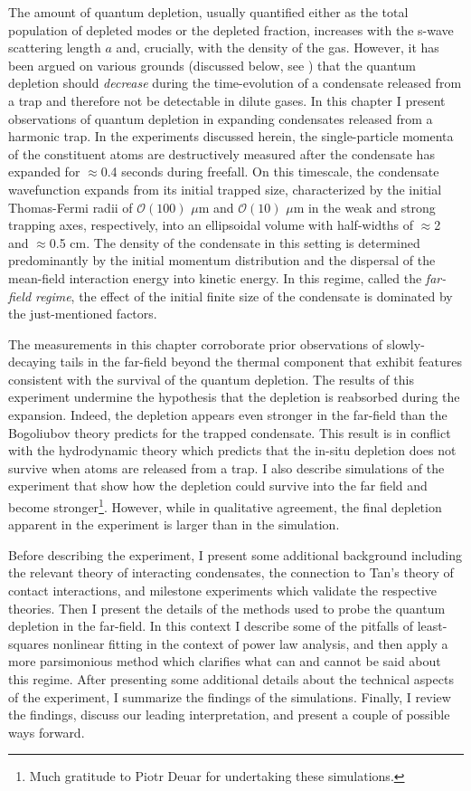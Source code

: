 	The amount of quantum depletion, usually quantified either as the total population of depleted modes or the depleted fraction, increases with the s-wave scattering length $a$ and, crucially, with the density of the gas. 
	However, it has been argued on various grounds (discussed below, see \cite{Xu06,Qu16}) that the quantum depletion should \emph{decrease} during the time-evolution of a condensate released from a trap and therefore not be detectable in dilute gases.
	In this chapter I present observations of quantum depletion in expanding condensates released from a harmonic trap. 
	In the experiments discussed herein, the single-particle momenta of the constituent atoms are destructively measured after the condensate has expanded for $\approx$0.4 seconds during freefall.
	On this timescale, the condensate wavefunction expands from its initial trapped size, characterized by the initial Thomas-Fermi radii of  $\mathcal{O}(100)$ $\mu$m and $\mathcal{O}(10)$ $\mu$m in the weak and strong trapping axes, respectively, into an ellipsoidal volume with half-widths of $\approx$2 and $\approx$0.5 cm. 
	The density of the condensate in this setting is determined predominantly by the initial momentum distribution and the dispersal of the mean-field interaction energy into kinetic energy.
	In this regime, called the \emph{far-field regime}, the effect of the initial finite size of the condensate is dominated by the just-mentioned factors.

	The measurements in this chapter corroborate prior observations \cite{Chang16} of slowly-decaying tails in the far-field beyond the thermal component that exhibit features consistent with the survival of the quantum depletion. 
	The results of this experiment undermine the hypothesis that the depletion is reabsorbed during the expansion. 
	Indeed, the depletion appears even stronger in the far-field than the Bogoliubov theory predicts for the trapped condensate. 
	This result is in conflict with the hydrodynamic theory which predicts that the in-situ depletion does not survive when atoms are released from a trap.  
	I also describe simulations of the experiment that show how the depletion could survive into the far field and become stronger\footnote{Much gratitude to Piotr Deuar for undertaking these simulations.}. 
	However, while in qualitative agreement, the final depletion apparent in the experiment is larger than in the simulation.

	Before describing the experiment, I present some additional background including the relevant theory of interacting condensates, the connection to Tan's theory of contact interactions, and milestone experiments which validate the respective theories. Then I present the details of the methods used to probe the quantum depletion in the far-field. In this context I describe some of the pitfalls of least-squares nonlinear fitting in the context of power law analysis, and then apply a more parsimonious method which clarifies what can and cannot be said about this regime. After presenting some additional details about the technical aspects of the experiment, I summarize the findings of the simulations. Finally, I review the findings, discuss our leading interpretation, and present a couple of possible ways forward.


